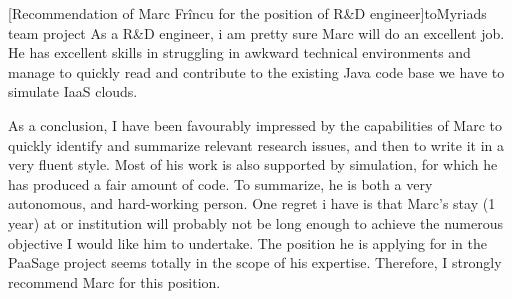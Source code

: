 \documentclass[a4paper,10pt]{article}
\begin{document}
\begin{letter}[Recommendation of Marc Fr\^incu for the position of R\&D engineer]{to}{Myriads team project}
As a  R\&D engineer,  i am pretty  sure Marc  will do an  excellent job.  He has
excellent skills in  struggling in awkward technical environments  and manage to
quickly read and contribute  to the existing Java code base  we have to simulate
IaaS clouds.

As a conclusion, I have been favourably impressed by the capabilities of Marc to
quickly identify and summarize relevant research issues, and then to write it in
a very fluent style. Most of his work is also supported by simulation, for which
he  has produced  a  fair amount  of  code.  To  summarize, he  is  both a  very
autonomous, and hard-working  person.  One regret i have is  that Marc's stay (1
year) at or institution will probably not be long enough to achieve the numerous
objective I would like him to undertake.  The position he is applying for in the
PaaSage  project seems  totally in  the scope  of his  expertise.  Therefore,  I
strongly recommend Marc for this position.


\end{letter}
\begin{flushright}
\end{flushright}
%
%
\end{document}
